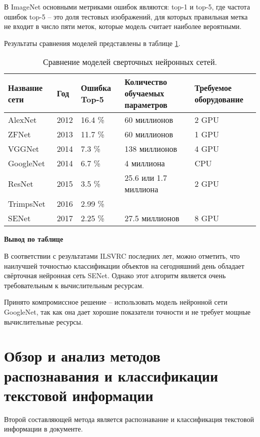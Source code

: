 В ImageNet основными метриками ошибок являются: top-1 и top-5, где частота ошибок top-5 -- это доля тестовых изображений, для которых правильная метка не входит в число пяти меток, которые модель считает наиболее вероятными.

Результаты сравнения моделей представлены в таблице \ref{table:cnncompare}.

\begin{table}[H]
\caption{Сравнение моделей сверточных нейронных сетей. }
\begin{tabular}{|p{2.5cm}|p{1.5cm}|p{2cm}|p{5cm}|p{4cm}|}
\hline
Название сети \cite{cnn} & Год & Ошибка Top-5 & Количество обучаемых параметров \cite{numparams} & Требуемое оборудование \cite{gpu} \\ \hline
AlexNet    & 2012 & 16.4 \% & 60 миллионов & 2 GPU \\ \hline
ZFNet     & 2013 & 11.7 \%  & 60 миллионов  & 1 GPU \\ \hline
VGGNet    & 2014 & 7.3 \%  & 138 миллионов & 4 GPU \\ \hline
GoogleNet   & 2014 & 6.7 \%  & 4 миллиона & CPU \\ \hline
ResNet    & 2015 & 3.5 \%  & 25.6 или 1.7 миллиона & 2 GPU \\ \hline
TrimpsNet   & 2016 & 2.99 \%  & & \\ \hline
SENet     & 2017 & 2.25 \%  & 27.5 миллионов & 8 GPU \\ \hline
\end{tabular}
\label{table:cnncompare}
\end{table}

\textbf{Вывод по таблице}

В соответствии с результатами ILSVRC последних лет, можно отметить, что наилучшей точностью классификации объектов на сегодняшний день обладает свёрточная нейронная сеть SENet. Однако этот алгоритм является очень требовательным к вычислительным ресурсам.

Принято компромиссное решение -- использовать модель нейронной сети GoogleNet, так как она дает хорошие показатели точности и не требует мощные вычислительные ресурсы.

\section{Обзор и анализ методов распознавания и классификации текстовой информации}

Второй составляющей метода является распознавание и классификация текстовой информации в документе.

